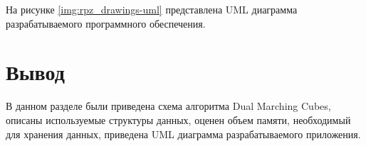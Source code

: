 На рисунке \ref{img:rpz_drawings-uml} представлена UML диаграмма разрабатываемого программного обеспечения.


\clearpage

\section*{Вывод}

В данном разделе были приведена схема алгоритма Dual Marching Cubes, описаны используемые структуры данных, оценен объем памяти, необходимый для хранения данных, приведена UML диаграмма разрабатываемого приложения.

